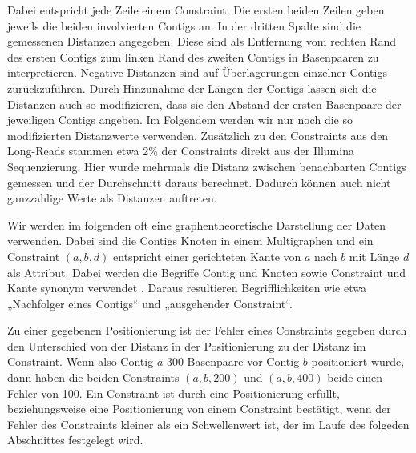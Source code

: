 Dabei entspricht jede Zeile einem Constraint. Die ersten beiden Zeilen geben jeweils die beiden involvierten Contigs an. In der dritten Spalte sind die gemessenen Distanzen angegeben. Diese sind als Entfernung vom rechten Rand des ersten Contigs zum linken Rand des zweiten Contigs in Basenpaaren zu interpretieren. Negative Distanzen sind auf Überlagerungen einzelner Contigs zurückzuführen. Durch Hinzunahme der Längen der Contigs lassen sich die Distanzen auch so modifizieren, dass sie den Abstand der ersten Basenpaare der jeweiligen Contigs angeben. Im Folgendem werden wir nur noch die so modifizierten Distanzwerte verwenden. Zusätzlich zu den Constraints aus den Long-Reads stammen etwa 2\% der Constraints direkt aus der Illumina Sequenzierung. Hier wurde mehrmals die Distanz zwischen 
benachbarten Contigs gemessen und der Durchschnitt daraus berechnet. Dadurch können auch nicht ganzzahlige Werte als Distanzen auftreten.

Wir werden im folgenden oft eine graphentheoretische Darstellung der Daten verwenden. Dabei sind die Contigs Knoten in einem Multigraphen und ein Constraint $(a,b,d)$ 
entspricht einer 
gerichteten Kante von $a$ nach $b$ mit Länge $d$ als Attribut. Dabei werden die Begriffe Contig und Knoten sowie Constraint und Kante synonym verwendet
. Daraus resultieren Begrifflichkeiten wie etwa „Nachfolger eines Contigs“ und „ausgehender Constraint“.

Zu einer gegebenen Positionierung ist der Fehler eines Constraints gegeben durch den Unterschied von der Distanz in der Positionierung zu der Distanz im Constraint. Wenn also Contig $a$ 300 Basenpaare vor Contig $b$ positioniert wurde, dann haben die beiden Constraints $(a,b,200)$ und $(a,b,400)$ beide einen Fehler von 100.
Ein Constraint ist durch eine Positionierung erfüllt, 
beziehungsweise eine Positionierung von einem Constraint bestätigt, wenn der Fehler des Constraints kleiner als ein Schwellenwert ist, der im Laufe des folgeden Abschnittes festgelegt wird.
